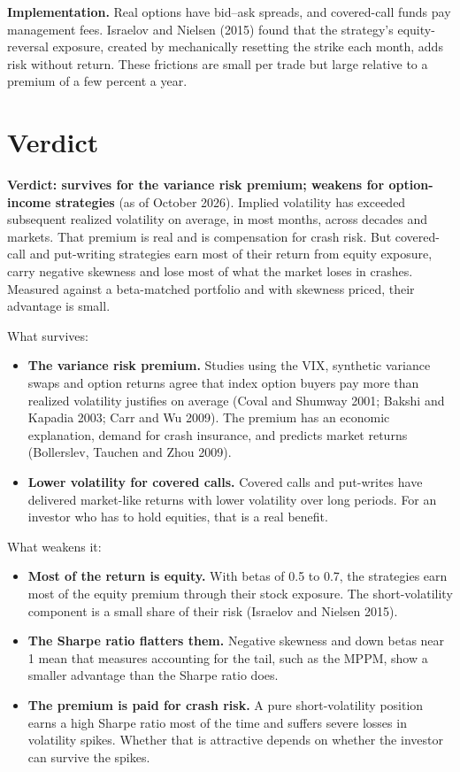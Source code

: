 \textbf{Implementation.} Real options have bid--ask spreads, and covered-call funds pay management fees. Israelov and Nielsen (2015) found that the strategy's equity-reversal exposure, created by mechanically resetting the strike each month, adds risk without return. These frictions are small per trade but large relative to a premium of a few percent a year.

\section{Verdict}
\label{sec:14-verdict}

\begin{callout}
\textbf{Verdict: survives for the variance risk premium; weakens for option-income strategies} (as of October 2026). Implied volatility has exceeded subsequent realized volatility on average, in most months, across decades and markets. That premium is real and is compensation for crash risk. But covered-call and put-writing strategies earn most of their return from equity exposure, carry negative skewness and lose most of what the market loses in crashes. Measured against a beta-matched portfolio and with skewness priced, their advantage is small.
\end{callout}

What survives:

\begin{itemize}
  \item \textbf{The variance risk premium.} Studies using the VIX, synthetic variance swaps and option returns agree that index option buyers pay more than realized volatility justifies on average (Coval and Shumway 2001; Bakshi and Kapadia 2003; Carr and Wu 2009). The premium has an economic explanation, demand for crash insurance, and predicts market returns (Bollerslev, Tauchen and Zhou 2009).
  \item \textbf{Lower volatility for covered calls.} Covered calls and put-writes have delivered market-like returns with lower volatility over long periods. For an investor who has to hold equities, that is a real benefit.
\end{itemize}

What weakens it:

\begin{itemize}
  \item \textbf{Most of the return is equity.} With betas of 0.5 to 0.7, the strategies earn most of the equity premium through their stock exposure. The short-volatility component is a small share of their risk (Israelov and Nielsen 2015).
  \item \textbf{The Sharpe ratio flatters them.} Negative skewness and down betas near 1 mean that measures accounting for the tail, such as the MPPM, show a smaller advantage than the Sharpe ratio does.
  \item \textbf{The premium is paid for crash risk.} A pure short-volatility position earns a high Sharpe ratio most of the time and suffers severe losses in volatility spikes. Whether that is attractive depends on whether the investor can survive the spikes.
\end{itemize}

